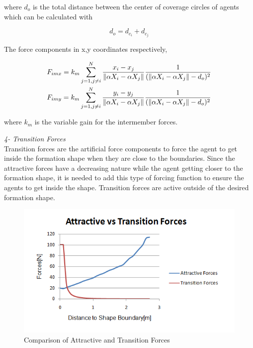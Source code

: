 where $d_o$ is the total distance between the center of coverage circles of agents which can be calculated with

\begin{equation}
 d_o = d_{c_i} + d_{c_j}
\end{equation}			

The force components in x,y coordinates respectively,

\begin{align}
\begin{split}
&F_{imx} = k_m \sum_{j=1, j\neq i}^{N}\frac{x_i- x_j}{\left\lVert\alpha X_i - \alpha X_j\right\rVert}  \frac{1}{(\left\lVert\alpha X_i - \alpha X_j\right\rVert - d_o)^2}\\
&F_{imy} = k_m \sum_{j=1, j\neq i}^{N}\frac{y_i- y_j}{\left\lVert\alpha X_i - \alpha X_j\right\rVert}  \frac{1}{(\left\lVert\alpha X_i - \alpha X_j\right\rVert - d_o)^2}\\
\end{split}
\end{align}
		
where $k_m$ is the variable gain for the intermember forces.  \newline
			
\textit{4- Transition Forces} \\ 		
Transition forces are the artificial force components to force the agent to get inside the formation shape when they are close to the boundaries. Since the attractive forces have a decreasing nature while the agent getting closer to the formation shape, it is needed to add this type of forcing function to ensure the agents to get inside the shape. Transition forces are active outside of the desired formation shape.
			
\begin{figure}[H]
\caption{Comparison of Attractive and Transition Forces}
\centering
\includegraphics[scale = 0.80]{transition_forces}
\end{figure}		

